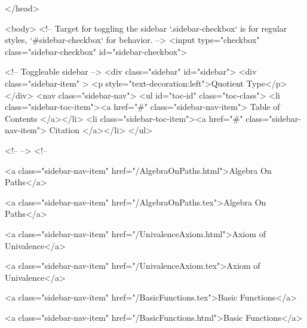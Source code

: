   
</head>




  <body>
    <!-- Target for toggling the sidebar `.sidebar-checkbox` is for regular
     styles, `#sidebar-checkbox` for behavior. -->
<input type="checkbox" class="sidebar-checkbox" id="sidebar-checkbox">

<!-- Toggleable sidebar -->
<div class="sidebar" id="sidebar">
  <div class="sidebar-item" >
    <p style="text-decoration:left">Quotient Type</p>
  </div>
  <nav class="sidebar-nav">
    <ul id="toc-id" class="toc-class">
  <li class="sidebar-toc-item"><a href="#" class="sidebar-nav-item"> Table of Contents </a></li>
  <li class="sidebar-toc-item"><a href="#" class="sidebar-nav-item"> Citation </a></li>
</ul>


    <!--  -->
    <!-- 
      
    
      
    
      
    
      
        
      
    
      
        
          <a class="sidebar-nav-item" href="/AlgebraOnPaths.html">Algebra On Paths</a>
        
      
    
      
        
          <a class="sidebar-nav-item" href="/AlgebraOnPaths.tex">Algebra On Paths</a>
        
      
    
      
        
          <a class="sidebar-nav-item" href="/UnivalenceAxiom.html">Axiom of Univalence</a>
        
      
    
      
        
          <a class="sidebar-nav-item" href="/UnivalenceAxiom.tex">Axiom of Univalence</a>
        
      
    
      
        
          <a class="sidebar-nav-item" href="/BasicFunctions.tex">Basic Functions</a>
        
      
    
      
        
          <a class="sidebar-nav-item" href="/BasicFunctions.html">Basic Functions</a>
        
      
    
      
        
